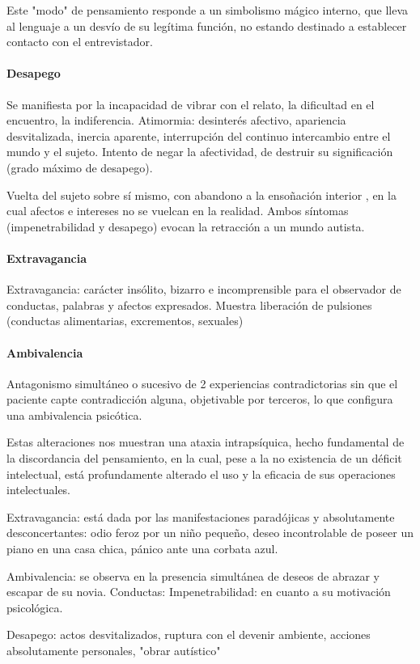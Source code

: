 Este "modo" de pensamiento responde a un simbolismo mágico interno, que lleva al lenguaje a un desvío de su legítima función, no estando destinado a establecer contacto con el entrevistador.

\paragraph*{Desapego}
Se manifiesta por la incapacidad de vibrar con el relato, la dificultad en el encuentro, la indiferencia. Atimormia: desinterés afectivo, apariencia desvitalizada, inercia aparente, interrupción del continuo intercambio entre el mundo y el sujeto. Intento de negar la afectividad, de destruir su significación (grado máximo de desapego).

Vuelta del sujeto sobre sí mismo, con abandono a la ensoñación interior , en la cual afectos e intereses no se vuelcan en la realidad. Ambos síntomas (impenetrabilidad y desapego) evocan la retracción a un mundo autista.
\paragraph*{Extravagancia}
Extravagancia: carácter insólito, bizarro e incomprensible para el observador de conductas, palabras y afectos expresados. Muestra liberación de pulsiones (conductas alimentarias, excrementos, sexuales)
\paragraph*{Ambivalencia}
Antagonismo simultáneo o sucesivo de 2 experiencias contradictorias sin que el paciente capte contradicción alguna, objetivable por terceros, lo que configura una ambivalencia psicótica.

Estas alteraciones nos muestran una ataxia intrapsíquica, hecho fundamental de la discordancia del pensamiento, en la cual, pese a la no existencia de un déficit intelectual, está profundamente alterado el uso y la eficacia de sus operaciones intelectuales.

Extravagancia: está dada por las manifestaciones paradójicas y absolutamente desconcertantes: odio feroz por un niño pequeño, deseo incontrolable de poseer un piano en una casa chica, pánico ante una corbata azul.

Ambivalencia: se observa en la presencia simultánea de deseos de abrazar y escapar de su novia. Conductas: Impenetrabilidad: en cuanto a su motivación psicológica.

Desapego: actos desvitalizados, ruptura con el devenir ambiente, acciones absolutamente personales, "obrar autístico"

